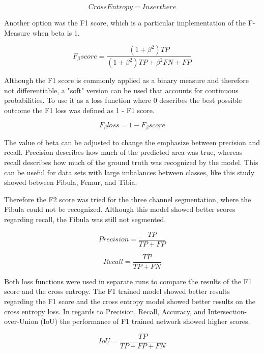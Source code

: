 \begin{equation}
Cross Entropy = Insert here
\end{equation}

Another option was the F1 score, which is a particular implementation of the F-Measure when beta is 1. 

\begin{equation}
F_\beta score= \frac{(1 + \beta^2) TP}{(1+\beta^2)TP+\beta^2FN+FP}
\end{equation}

Although the F1 score is commonly applied as a binary measure and therefore not differentiable, a "soft" version can be used that accounts for continuous probabilities. To use it as a loss function where 0 describes the best possible outcome the F1 loss was defined as 1 - F1 score.

\begin{equation}
F_\beta loss = 1 - F_\beta score
\end{equation}

The value of beta can be adjusted to change the emphasize between precision and recall. Precision describes how much of the predicted area was true, whereas recall describes how much of the ground truth was recognized by the model. This can be useful for data sets with large imbalances between classes, like this study showed between Fibula, Femur, and Tibia. 

Therefore the F2 score was tried for the three channel segmentation, where the Fibula could not be recognized. Although this model showed better scores regarding recall, the Fibula was still not segmented.

\begin{equation}
Precision = \frac{TP}{TP+FP}
\end{equation}

\begin{equation}
Recall = \frac{TP}{TP+FN}
\end{equation}

Both loss functions were used in separate runs to compare the results of the F1 score and the cross entropy. The F1 trained model showed better results regarding the F1 score and the cross entropy model showed better results on the cross entropy loss. In regards to Precision, Recall, Accuracy, and Intersection-over-Union (IoU) the performance of F1 trained network showed higher scores.

\begin{equation}
IoU= \frac{TP}{TP+FP+FN}
\end{equation}

